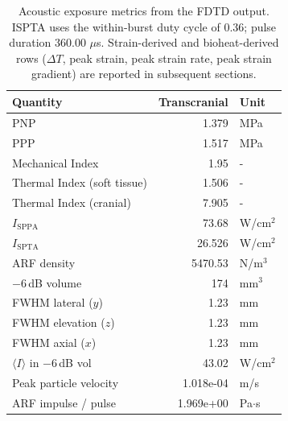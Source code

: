 \documentclass[11pt,letterpaper]{article}
\begin{document}
\begin{table}[h!]
\centering
\scriptsize
\setlength{\tabcolsep}{6pt}
\renewcommand{\arraystretch}{1.05}


\begin{tabular}{l r  l}
\toprule
\textbf{Quantity} & \textbf{Transcranial}  & \textbf{Unit} \\
\midrule
PNP                                  & 1.379        & MPa \\
PPP                                  & 1.517        & MPa \\
Mechanical Index                     & 1.95             & - \\
Thermal Index (soft tissue)          & 1.506        & - \\
Thermal Index (cranial)              & 7.905     & - \\
$I_{\mathrm{SPPA}}$                  & 73.68    & W/cm$^2$ \\
$I_{\mathrm{SPTA}}$                  & 26.526    & W/cm$^2$ \\
ARF density                          & 5470.53   & N/m$^3$ \\
$-6$\,dB volume                      & 174 & mm$^3$ \\
FWHM lateral ($y$)                   & 1.23      & mm \\
FWHM elevation ($z$)                 & 1.23      & mm \\
FWHM axial ($x$)                     & 1.23      & mm \\
$\langle I \rangle$ in $-6$\,dB vol  & 43.02   & W/cm$^2$ \\
Peak particle velocity               & 1.018e-04 & m/s \\
ARF impulse / pulse                  & 1.969e+00 & Pa$\cdot$s \\
\bottomrule
\end{tabular}
\caption{Acoustic exposure metrics from the FDTD output.  ISPTA uses the within-burst duty cycle of 0.36; pulse duration 360.00 $\mu$s.  Strain-derived and bioheat-derived rows ($\Delta T$, peak strain, peak strain rate, peak strain gradient) are reported in subsequent sections.}
\label{tab:acoustic_outputs}
\end{table}
\end{document}
